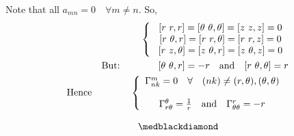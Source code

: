 Note that all $a_{mn} = 0 \quad \forall m\ne n$. So,
\begin{align}
\left \{ \begin{array}{c}
\ [r \ r,r]=[\theta \  \theta, \theta] = [z \ z,z] = 0\\
\ [r \ \theta,r]=[r \ r, \theta] = [r \ r,z] = 0\\
\ [r \ z,\theta]=[z \  \theta, r] = [z \ \theta,z] = 0\\
\end{array}\right.\\
\text{But:}\quad\quad\quad\quad [\theta \ \theta,r]= -r \quad\text{and}\quad [r \  \theta, \theta] = r\\
\text{Hence}\quad\quad\quad\quad \left \{ \begin{array}{c}
\Gamma^m_{nk} = 0 \quad\forall\quad (nk) \ne (r, \theta), (\theta, \theta)\\\\
\Gamma^{\theta}_{r\theta} = \frac{1}{r} \quad\text{and}\quad \Gamma^r_{\theta\theta} = -r
\end{array}\right.\
\end{align}

$$\medblackdiamond$$
\newpage

